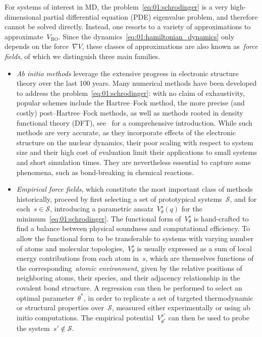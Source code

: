 For systems of interest in MD, the problem~\eqref{eq:01:schrodinger} is a very high-dimensional partial differential equation (PDE) eigenvalue problem, and therefore cannot be solved directly. Instead, one resorts to a variety of approximations to approximate~$V_{\mathrm{BO}}$.
Since the dynamics~\eqref{eq:01:hamiltonian_dynamics} only depends on the force~$\nabla V$, these classes of approximations are also known as~\textit{force fields}, of which we distinguish three main families.
\begin{itemize}
    \item{\textit{Ab initio methods} leverage the extensive progress in electronic structure theory over the last 100 years. Many numerical methods have been developed to address the problem~\eqref{eq:01:schrodinger}: with no claim of exhaustivity, popular schemes include the Hartree--Fock method, the more precise (and costly) post--Hartree--Fock methods, as well as methods rooted in density functional theory (DFT), see~\cite{J99} for a comprehensive introduction. While such methods are very accurate, as they incorporate effects of the electronic structure on the nuclear dynamics, their poor scaling with respect to system size and their high cost of evaluation limit their applications to small systems and short simulation times. They are nevertheless essential to capture some phenomena, such as bond-breaking in chemical reactions.}
    \item{\textit{Empirical force fields}, which constitute the most important class of methods historically, proceed by first selecting a set of prototypical systems~$\mathcal S$, and for each~$s\in\mathcal S$, introducing a parametric ansatz~$V^{s}_\theta(q)$ for the minimum~\eqref{eq:01:schrodinger}. The functional form of~$V^s_\theta$ is hand-crafted to find a balance between physical soundness and computational efficiency. To allow the functional form to be transferable to systems with varying number of atoms and molecular topologies,~$V^s_\theta$ is usually expressed as a sum of local energy contributions from each atom in~$s$, which are themselves functions of the corresponding~\textit{atomic environment}, given by the relative positions of neighboring atoms, their species, and their adjacency relationship in the covalent bond structure. A regression can then be performed to select an optimal parameter~$\theta^*$, in order to replicate a set of targeted thermodynamic or structural properties over~$\mathcal S$, measured either experimentally or using ab initio computations. The empirical potential~$V_{\theta^*}^{s'}$ can then be used to probe the system~$s'\not\in\mathcal S$.
}
\end{itemize}
